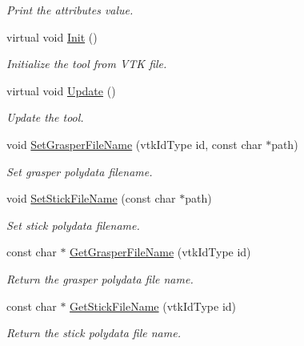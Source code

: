 \begin{DoxyCompactItemize}
\begin{DoxyCompactList}\small\item\em Print the attributes value. \item\end{DoxyCompactList}\item 
virtual void \hyperlink{classvtkToolPincers_ae4918610073324c94dddd8da234742a9}{Init} ()
\begin{DoxyCompactList}\small\item\em Initialize the tool from VTK file. \item\end{DoxyCompactList}\item 
virtual void \hyperlink{classvtkToolPincers_a57986aee2bcfa04472410cd7bf5c7929}{Update} ()
\begin{DoxyCompactList}\small\item\em Update the tool. \item\end{DoxyCompactList}\item 
void \hyperlink{classvtkToolPincers_a478f107b430191c0e1098e938b35b975}{SetGrasperFileName} (vtkIdType id, const char $\ast$path)
\begin{DoxyCompactList}\small\item\em Set grasper polydata filename. \item\end{DoxyCompactList}\item 
void \hyperlink{classvtkToolPincers_a844db9dccd0034605ddd23de176ac9dc}{SetStickFileName} (const char $\ast$path)
\begin{DoxyCompactList}\small\item\em Set stick polydata filename. \item\end{DoxyCompactList}\item 
const char $\ast$ \hyperlink{classvtkToolPincers_a1f673edc2bee876530a721833f1c77f1}{GetGrasperFileName} (vtkIdType id)
\begin{DoxyCompactList}\small\item\em Return the grasper polydata file name. \item\end{DoxyCompactList}\item 
const char $\ast$ \hyperlink{classvtkToolPincers_acb1210b1b77be2a7030b05c3b9e63ff5}{GetStickFileName} (vtkIdType id)
\begin{DoxyCompactList}\small\item\em Return the stick polydata file name. \item\end{DoxyCompactList}\item 

\end{DoxyCompactItemize}
